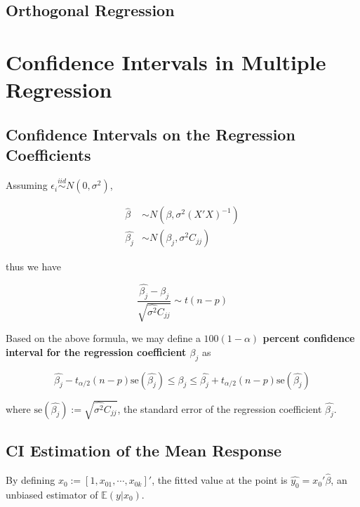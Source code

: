 \documentclass[12pt]{article}
\begin{document}
\subsection*{Orthogonal Regression}


\pagebreak
\setcounter{section}{3}
\section{Confidence Intervals in Multiple Regression}

\subsection{Confidence Intervals on the Regression Coefficients}

Assuming $\epsilon_i \overset{iid}{\sim} N(0, \sigma^2)$,

$$
\begin{aligned}
\hat{\beta} &\sim N\left( \beta, \sigma^2 (X'X)^{-1} \right) \\[8pt]
\hat{\beta_j} &\sim N\left( \beta_j, \sigma^2 C_{jj} \right)
\end{aligned}
$$

thus we have

$$
\frac{ \hat{\beta_j} - \beta_j }  { \sqrt{ \hat{\sigma^2} C_{jj} } } \sim t(n-p)
$$

Based on the above formula, we may define a \textbf{$100(1-\alpha)$ percent confidence interval for the regression coefficient $\beta_j$} as 

$$
\hat{\beta_j} - t_{\alpha/2}(n-p) \mathrm{se}(\hat{\beta_j}) \le \beta_j \le \hat{\beta_j} + t_{\alpha/2}(n-p) \mathrm{se}(\hat{\beta_j})
$$

where $ \mathrm{se}(\hat{\beta_j}) := \sqrt{\hat{\sigma^2} C_{jj}}$, the standard error of the regression coefficient $\hat{\beta_j}$. 



\subsection{CI Estimation of the Mean Response}


By defining $x_0 := [1, x_{01}, \cdots, x_{0k}]'$, the fitted value at the point is $\hat{y_0} = x_0' \hat{\beta}$, an unbiased estimator of $\mathbb{E} (y | x_0)$. 
\end{document}
